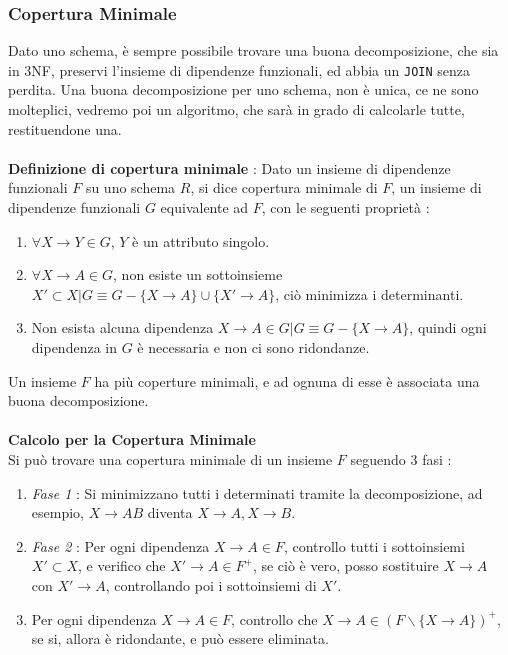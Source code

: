 \documentclass[12pt, letterpaper]{article}
\newcommand{\codee}[1]{\colorbox{white}{\texttt{#1}}}
\newcommand{\acc}{\\\hphantom{}\\}
\begin{document}
\subsubsection{Copertura Minimale}
Dato uno schema, è sempre possibile trovare una buona decomposizione, che sia in 3NF, preservi l'insieme di dipendenze funzionali,
ed abbia un \codee{JOIN} senza perdita. Una buona decomposizione per uno schema, non è unica, ce ne sono molteplici, vedremo poi un 
algoritmo, che sarà in grado di calcolarle tutte, restituendone una.\acc 
\textbf{Definizione di copertura minimale} : Dato un insieme di dipendenze funzionali \(F\) su uno 
schema \(R\), si dice copertura minimale di \(F\), un insieme di dipendenze funzionali \(G\) equivalente ad \(F\), con le 
seguenti proprietà : \begin{enumerate}
    \item \(\forall X\rightarrow Y \in G\), \(Y\) è un attributo singolo.
    \item \(\forall X\rightarrow A \in G\), non esiste un sottoinsieme \(X'\subset X|G\equiv G-\{X\rightarrow A\}\cup \{X'\rightarrow A\}\), 
    ciò minimizza i determinanti.
    \item Non esista alcuna dipendenza \(X\rightarrow A \in G|G\equiv G-\{X\rightarrow A\}\), quindi ogni dipendenza in \(G\) è 
    necessaria e non ci sono ridondanze.
\end{enumerate}
Un insieme \(F\) ha più coperture minimali, e ad ognuna di esse è associata una buona decomposizione.\acc 
\textbf{Calcolo per la Copertura Minimale} \\ 
Si può trovare una copertura minimale di un insieme \(F\) seguendo 3 fasi :\begin{enumerate}
    \item \textit{Fase 1} : Si minimizzano tutti i determinati tramite la decomposizione, ad esempio, \(X\rightarrow AB\) diventa 
    \(X\rightarrow A,X\rightarrow B\).
    \item \textit{Fase 2} : Per ogni dipendenza \(X\rightarrow A\in F\), controllo tutti i sottoinsiemi \(X'\subset X\), e 
    verifico che \(X'\rightarrow A\in F^+\), se ciò è vero, posso sostituire \(X\rightarrow A\) con 
    \(X'\rightarrow A\), controllando poi i sottoinsiemi di \(X'\).
    \item  Per ogni dipendenza \(X\rightarrow A\in F\), controllo che \(X\rightarrow A \in (F\backslash\{X\rightarrow A\})^+\), 
    se si, allora è ridondante, e può essere eliminata.
\end{enumerate}
\end{document}
